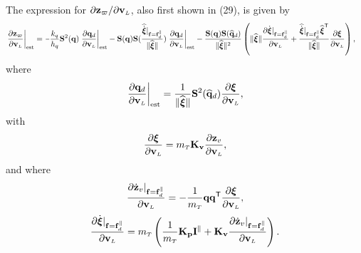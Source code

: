 \documentclass[journal,onecolumn]{IEEEtran}
\newcommand{\minus}{\scalebox{0.75}[1.0]{$-$}}
\begin{document}
	The expression for $\partial\zc/\partial\vL$, also first shown in (29), is given by
    \begin{align}
        \left.\frac{\partial\zc}{\partial\vL}\right|_{\text{est}} =&~ \minus \frac{k_q}{h_{q}}\Skew[2]{\dir}\left.\frac{\partial\dird}{\partial\vL}\right|_{\text{est}} -
        \Skew{\dir}\Skew{\frac{\widehat{\dot{\Xiq}}|_{\f=\f_d^{\|}}}{\|\widehat{\Xiq}\|}} \left.\frac{\partial\dird}{\partial\vL}\right|_{\text{est}}
        -\frac{\Skew{\dir}\Skew{\qdhat}}{\|\widehat{\Xiq}\|^2}\left(\|\widehat{\Xiq}\|\frac{\partial\dot{\Xiq}|_{\f=\fd^{\|}}}{\partial\vL} + \frac{\widehat{\dot{\Xiq}}|_{\f=\f_d^{\|}}\widehat{\Xiq}\trs}{\|\widehat{\Xiq}\|}\frac{\partial\Xiq}{\partial\vL}\right),
        \label{eq:partial_zw_vL}
	\end{align}
	where
	\begin{equation}
		\left.\frac{\partial\dird}{\partial\vL}\right|_{\text{est}} = \frac{1}{\|\widehat{\Xiq}\|}\Skew[2]{\qdhat}\frac{\partial\Xiq}{\partial\vL},
	\end{equation}
	with
	\begin{equation}
		\frac{\partial\Xiq}{\partial\vL} = \mT\v{K}_\v{v}\frac{\partial\zv}{\partial\vL},
	\end{equation}
	and where
	\begin{equation}
		\frac{\partial\zvdot|_{\f=\fd^{\|}}}{\partial\vL}=-\frac{1}{\mT}\dir\dir[T]\frac{\partial\Xiq}{\partial\vL},
	\end{equation}
	\begin{equation}
		\frac{\partial\dot{\Xiq}|_{\f=\fd^{\|}}}{\partial\vL}=\mT\LP\frac{1}{\mT}{\bf K_p} {\bf I}^{\|} + {\bf K_v} \frac{\partial\zvdot|_{\f=\fd^{\|}}}{\partial\vL}\RP.
	\end{equation}
%
\end{document}
